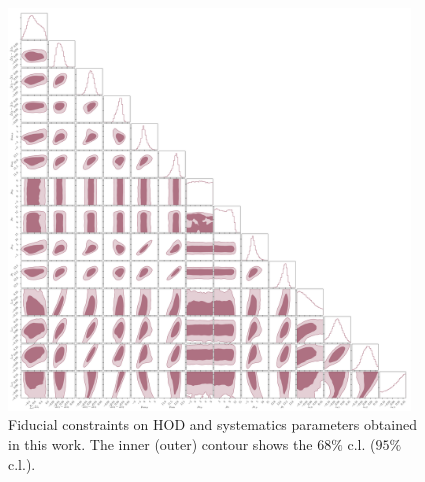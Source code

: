 \documentclass[a4paper,11pt]{article}
\begin{document}
\begin{figure}
  \begin{center}
    \includegraphics[width=0.95\textwidth]{figures/contours_mPk=HOD_fix=alpha-fc-sigmaM_HOD=zevol_fit=pz-shifts+prior=0p2-pz-widths+prior=0p2_fit=auto+cross_cosmo=const_cov=G+NG+SSC-LINBIAS_HOD-param=zfid_clfit=HOD-zevol.pdf}
    \caption{Fiducial constraints on HOD and systematics parameters obtained in this work. The inner (outer) contour shows the $68 \%$ c.l. ($95 \%$ c.l.).}
    \label{fig:constraints-fid-full}
  \end{center}
\end{figure}
\end{document}
